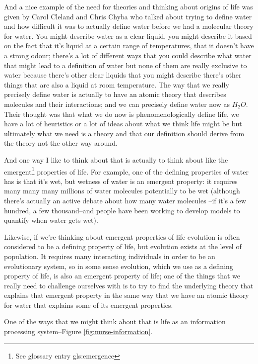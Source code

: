 \documentclass[]{article}
\begin{document}
And a nice example of the need for
theories and thinking about origins of
life was given by Carol Cleland and
Chris Chyba \cite{cleland2002defining} who talked about
trying to define water and how difficult
it was to actually define water before
we had a molecular theory for water.
You might describe water as a clear
liquid, you might describe it based on
the fact that it's liquid at a certain
range of temperatures, that it 
doesn't have a strong odour; there's a lot
of different ways that you could
describe what water that might lead to a
definition of water but none of them are
really exclusive to water because
there's other clear liquids that you
might describe there's other things that
are also a liquid at room temperature.
The way that we really precisely
define  water is actually to have
an atomic theory that describes
molecules and their interactions; and we
can precisely define water now as $H_2O$.
Their thought was that what we do
now is  phenomenologically define
life, we have a lot of heuristics or a
lot of ideas about what we think life
might be but ultimately what we need is
a theory and that our definition should
derive from the theory not the other way
around.

And one way I like to think about
that is actually to think about like the
emergent\footnote{See glossary entry \gls{gls:emergence}} properties of life.
For example, one of the defining properties
of water has is that it's wet,
but wetness of water is an emergent
property: it requires many many many
millions of water molecules potentially
to be wet (although there's
actually an active debate
about how many water molecules
--if it's a few hundred, a few
thousand--and people have been working to
develop models to quantify when water
gets wet).

Likewise, if we're thinking about
emergent properties of life evolution is
often considered to be a defining
property of life, but evolution exists at
the level of population. It requires
many interacting individuals
in order to be an evolutionary
system, so in some sense evolution,
which we use as a defining property of
life, is also an emergent property of
life; one of the things that we
really need to challenge ourselves with
is to try to find the underlying theory
that explains that emergent property in
the same way that we have an atomic
theory for water that explains some of
its emergent properties.

One of the ways that we might think about that
is life as an
information processing system--Figure \ref{fig:nurse-information}.
\end{document}

